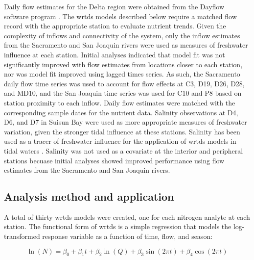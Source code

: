 \documentclass[letterpaper,12pt,oneside]{article}\usepackage[]{graphicx}\usepackage[]{color}
\begin{document}
Daily flow estimates for the Delta region were obtained from the Dayflow software program \citep{IEP16}. The \ac{wrtds} models described below require a matched flow record with the appropriate station to evaluate nutrient trends. Given the complexity of inflows and connectivity of the system, only the inflow estimates from the Sacramento and San Joaquin rivers were used as measures of freshwater influence at each station.  Initial analyses indicated that model fit was not significantly improved with flow estimates from locations closer to each station, nor was model fit improved using lagged times series.  As such, the Sacramento daily flow time series was used to account for flow effects at C3, D19, D26, D28, and MD10, and the San Joaquin time series was used for C10 and P8 based on station proximity to each inflow. Daily flow estimates were matched with the corresponding sample dates for the nutrient data. Salinity observations at D4, D6, and D7 in Suisun Bay were used as more appropriate measures of freshwater variation, given the stronger tidal influence at these stations.  Salinity has been used as a tracer of freshwater influence for the application of \ac{wrtds} models in tidal waters \citep{Beck15}.  Salinity was not used as a covariate at the interior and peripheral stations becuase initial analyses showed improved performance using flow estimates from the Sacramento and San Joaquin rivers. 

\subsection{Analysis method and application}

A total of thirty \ac{wrtds} models were created, one for each nitrogen analyte at each station.  The functional form of \ac{wrtds} is a simple regression \citep{Hirsch10} that models the log-transformed response variable as a function of time, flow, and season:

\begin{equation}
\ln\left(N\right) = \beta_0 + \beta_1 t + \beta_2 \ln\left(Q\right) + \beta_3 \sin\left(2\pi t\right) + \beta_4 \cos\left(2\pi t\right)
\end{equation}  

\end{document}
